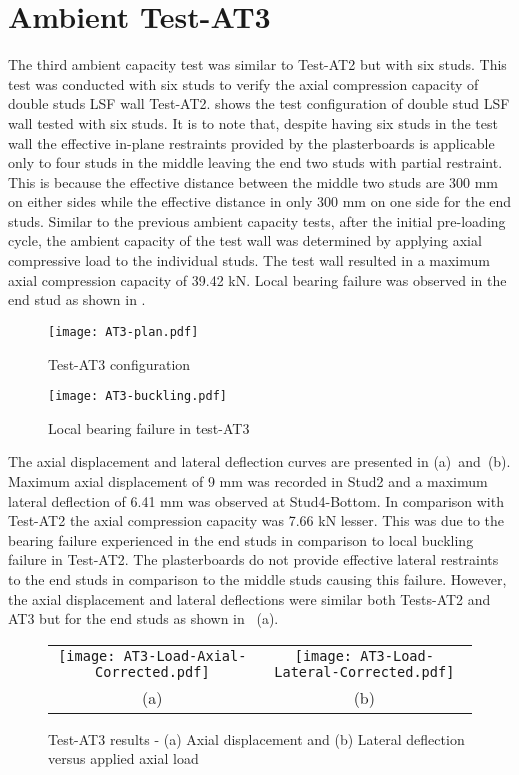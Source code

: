 \section{Ambient Test-AT3}

The third ambient capacity test was similar to Test-AT2 but with six studs. This test was conducted with six studs to verify the axial compression capacity of double studs LSF wall Test-AT2.  shows the test configuration of double stud LSF wall tested with six studs. It is to note that, despite having six studs in the test wall the effective in-plane restraints provided by the plasterboards is applicable only to four studs in the middle leaving the end two studs with partial restraint. This is because the effective distance between the middle two studs are 300 mm on either sides while the effective distance in only 300 mm on one side for the end studs. Similar to the previous ambient capacity tests, after the initial pre-loading cycle, the ambient capacity of the test wall was determined by applying axial compressive load to the individual studs. The test wall resulted in a maximum axial compression capacity of 39.42 kN. Local bearing failure was observed in the end stud as shown in .
\begin{figure}[!htbp]
	\centering
			\texttt{[image: AT3-plan.pdf]}\\
		\caption{Test-AT3 configuration}
		\label{fig:AT3-plan}
\end{figure}  
\begin{figure}[!htbp]
	\centering
			\texttt{[image: AT3-buckling.pdf]}\\
		\caption{Local bearing failure in test-AT3}
		\label{fig:AT3-buckling}
\end{figure}

The axial displacement and lateral deflection curves are presented in  (a)~and~(b). Maximum axial displacement of 9 mm was recorded in Stud2 and a maximum lateral deflection of 6.41 mm was observed at Stud4-Bottom. In comparison with Test-AT2 the axial compression capacity was 7.66 kN lesser. This was due to the bearing failure experienced in the end studs in comparison to local buckling failure in Test-AT2. The plasterboards do not provide effective lateral restraints to the end studs in comparison to the middle studs causing this failure. However, the axial displacement and lateral deflections were similar both Tests-AT2 and AT3 but for the end studs as shown in ~(a). 
\begin{figure}[!htbp]
	\centering
		\begin{tabular}{cc}
			\texttt{[image: AT3-Load-Axial-Corrected.pdf]} & \texttt{[image: AT3-Load-Lateral-Corrected.pdf]} \\ 
			(a) & (b)  \\ 
		\end{tabular} 
		\caption{Test-AT3 results - (a) Axial displacement and (b) Lateral deflection versus applied axial load}
		\label{fig:AT3-results}
\end{figure}

